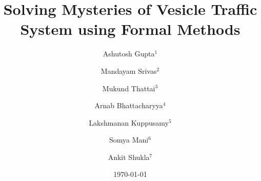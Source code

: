 \documentclass[draft]{llncs}
\begin{document}
\title{Solving Mysteries of Vesicle Traffic System using Formal Methods}

\author{Ashutosh Gupta$^1$ \and Mandayam Srivas$^2$ \and Mukund Thattai$^3$ \and Arnab Bhattacharyya$^4$ \and Lakshmanan Kuppusamy$^5$ \and Somya Mani$^6$ \and Ankit Shukla$^7$ } 


\date{\today}

\maketitle

\begin{abstract}

\end{abstract}

%

%
%

\appendix
\clearpage
\end{document}
